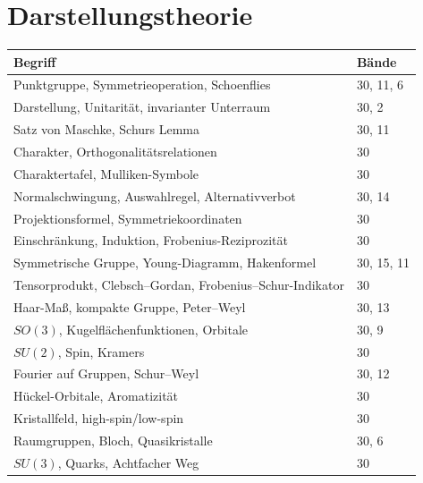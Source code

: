 \section*{Darstellungstheorie}
\nopagebreak
{\small\renewcommand{\arraystretch}{1.32}
\begin{longtable}{@{}P{5.6cm}P{2.8cm}@{}}
\toprule
\textbf{Begriff} & \textbf{Bände}\\
\midrule
\endhead
Punktgruppe, Symmetrieoperation, Schoenflies & 30, 11, 6\\
Darstellung, Unitarität, invarianter Unterraum & 30, 2\\
Satz von Maschke, Schurs Lemma & 30, 11\\
Charakter, Orthogonalitätsrelationen & 30\\
Charaktertafel, Mulliken-Symbole & 30\\
Normalschwingung, Auswahlregel, Alternativverbot & 30, 14\\
Projektionsformel, Symmetriekoordinaten & 30\\
Einschränkung, Induktion, Frobenius-Reziprozität & 30\\
Symmetrische Gruppe, Young-Diagramm, Hakenformel & 30, 15, 11\\
Tensorprodukt, Clebsch--Gordan, Frobenius--Schur-Indikator & 30\\
Haar-Maß, kompakte Gruppe, Peter--Weyl & 30, 13\\
$SO(3)$, Kugelflächenfunktionen, Orbitale & 30, 9\\
$SU(2)$, Spin, Kramers & 30\\
Fourier auf Gruppen, Schur--Weyl & 30, 12\\
Hückel-Orbitale, Aromatizität & 30\\
Kristallfeld, high-spin/low-spin & 30\\
Raumgruppen, Bloch, Quasikristalle & 30, 6\\
$SU(3)$, Quarks, Achtfacher Weg & 30\\
\bottomrule
\end{longtable}}

